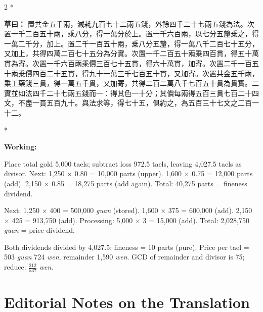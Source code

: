 \documentclass[11pt,a4paper]{article}
\newcommand{\CnWorking}[1]{\par\noindent\textbf{草曰：}#1\par\vspace{0.5ex}}
\newcommand{\EnWorking}{\par\noindent\textbf{Working:}\par\vspace{0.5ex}}
\newcommand{\switchCn}{\switchcolumn[0]*}
\newcommand{\switchEn}{\switchcolumn[1]*}
\begin{document}
\begin{paracol}{2}
\switchCn

\CnWorking{%
置共金五千兩，減耗九百七十二兩五錢，外餘四千二十七兩五錢為法。次置一千二百五十兩，乘八分，得一萬分於上。置一千六百兩，以七分五釐乗之，得一萬二千分，加上。置二千一百五十兩，乗八分五釐，得一萬八千二百七十五分，又加上，共得四萬二百七十五分為分實。次置一千二百五十兩乗四百貫，得五十萬貫為寄。次置一千六百兩乘價三百七十五貫，得六十萬貫，加寄。次置二千一百五十兩乗價四百二十五貫，得九十一萬三千七百五十貫，又加寄。次置共金五千兩，乗工藥錢三貫，得一萬五千貫，又加寄，共得二百二萬八千七百五十貫為貫實。二實並如法四千二十七兩五錢而一：得其色一十分；其價每兩得五百三貫七百二十四文，不盡一貫五百九十。與法求等，得七十五，俱約之，為五百三十七文之二百一十二。
}

\switchEn

\EnWorking
Place total gold 5,000 taels; subtract loss 972.5 taels, leaving 4,027.5 taels as divisor. Next: 1,250 $\times$ 0.80 = 10,000 parts (upper). 1,600 $\times$ 0.75 = 12,000 parts (add). 2,150 $\times$ 0.85 = 18,275 parts (add again). Total: 40,275 parts = fineness dividend.

Next: 1,250 $\times$ 400 = 500,000 \textit{guan} (stored). 1,600 $\times$ 375 = 600,000 (add). 2,150 $\times$ 425 = 913,750 (add). Processing: 5,000 $\times$ 3 = 15,000 (add). Total: 2,028,750 \textit{guan} = price dividend.

Both dividends divided by 4,027.5: fineness = 10 parts (pure). Price per tael = 503 \textit{guan} 724 \textit{wen}, remainder 1,590 \textit{wen}. GCD of remainder and divisor is 75; reduce: $\frac{212}{537}$ \textit{wen}.

\end{paracol}

\newpage

\section*{\color{titlecolor}Editorial Notes on the Translation}
\end{document}

